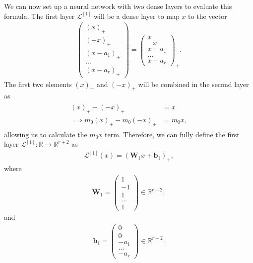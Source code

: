 \documentclass{somasmsc}
\begin{document}
We can now set up a neural network with two dense layers to evaluate this formula. The first layer $\mathcal{L}^{\left[1\right]}$ will be a dense layer to map $x$ to the vector
\begin{align*}
\begin{pmatrix}
    \left(x\right)_+ \\
    \left(-x\right)_+ \\
    \left(x - a_1\right)_+ \\
    \dots \\
    \left(x - a_r\right)_+
\end{pmatrix} =
\begin{pmatrix}
    x\ \\
    -x \\
    x - a_1 \\
    \dots \\
    x- a_r
\end{pmatrix}_+.
\end{align*}
The first two elements $\left(x\right)_+$ and $\left(-x\right)_+$ will be combined in the second layer as
\begin{align}\label{piece:eq4}
\begin{split}
\left(x\right)_+ - \left(-x\right)_+ &= x \\
\implies m_0 \left(x\right)_+ - m_0 \left(-x\right)_+ &= m_0 x,
\end{split}
\end{align}
allowing us to calculate the $m_0 x$ term. Therefore, we can fully define the first layer $\mathcal{L}^{\left[1\right]}: \mathbb{R} \rightarrow \mathbb{R}^{r+2}$ as
\begin{align*}
\mathcal{L}^{\left[1\right]}\left(x\right) = \left(\mathbf{W}_1 x + \pmb{b}_1\right)_+,
\end{align*}
where
\begin{align*}
\mathbf{W}_1 =
\begin{pmatrix}
    1 \\
    -1 \\
    1 \\
    \dots \\
    1
\end{pmatrix} \in \mathbb{R}^{r+2},
\end{align*}
and
\begin{align*}
\pmb{b}_1 =
\begin{pmatrix}
    0 \\
    0 \\
    -a_1 \\
    \dots \\
    -a_r
\end{pmatrix} \in \mathbb{R}^{r+2}.
\end{align*}
\end{document}
